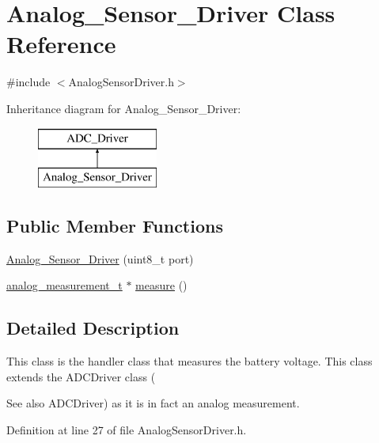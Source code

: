 \hypertarget{class_analog___sensor___driver}{\section{\-Analog\-\_\-\-Sensor\-\_\-\-Driver \-Class \-Reference}
\label{class_analog___sensor___driver}
}


{\ttfamily \#include $<$\-Analog\-Sensor\-Driver.\-h$>$}

\-Inheritance diagram for \-Analog\-\_\-\-Sensor\-\_\-\-Driver\-:\begin{figure}[H]
\begin{center}
\leavevmode
\includegraphics[height=2.000000cm]{class_analog___sensor___driver}
\end{center}
\end{figure}
\subsection*{\-Public \-Member \-Functions}
\begin{DoxyCompactItemize}
\item 
\hyperlink{class_analog___sensor___driver_afa62b398765d767b2eea98013f0ff398}{\-Analog\-\_\-\-Sensor\-\_\-\-Driver} (uint8\-\_\-t port)
\item 
\hyperlink{structanalog__measurement__t}{analog\-\_\-measurement\-\_\-t} $\ast$ \hyperlink{class_analog___sensor___driver_a85eecc1fba4b49cd366695e906ccf7ed}{measure} ()
\end{DoxyCompactItemize}


\subsection{\-Detailed \-Description}
\-This class is the handler class that measures the battery voltage. \-This class extends the \-A\-D\-C\-Driver class (\begin{DoxySeeAlso}{\-See also}
\-A\-D\-C\-Driver) as it is in fact an analog measurement. 
\end{DoxySeeAlso}


\-Definition at line 27 of file \-Analog\-Sensor\-Driver.\-h.



